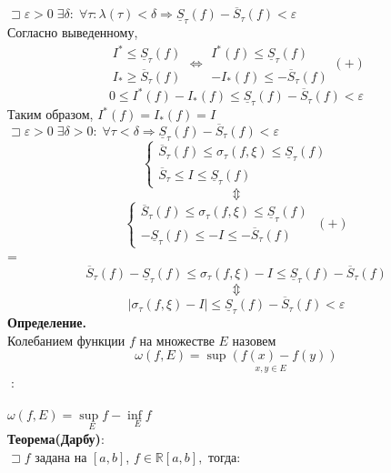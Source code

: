 \documentclass[14pt]{article}
\begin{document}
	$\sqsupset \varepsilon>0\; \exists \delta: \; \forall \tau : \lambda(\tau)<\delta \Rightarrow \underline{S}_{\tau}(f)-\overline{S}_{\tau}(f)<\varepsilon$ \\
	Согласно выведенному,  \\
	$$\boxed{\begin{gathered}
	I^*\leqslant \underline{S}_{\tau}(f) \\
	I_*\geqslant \overline{S}_{\tau}(f)
	\end{gathered} \iff \begin{gathered}
	I^*(f)\leqslant\underline{S}_{\tau}(f)\\
	-I_*(f)\leqslant-\overline{S}_{\tau}(f)
	\end{gathered} (+)}$$ 
	$$\boxed{0 \leqslant I^*(f)-I_*(f) \leqslant \underline{S}_{\tau}(f)-\overline{S}_{\tau}(f)<\varepsilon}$$ 
	Таким образом, $I^*(f)=I_*(f)=I$ \\
	$\sqsupset \varepsilon>0 \; \exists \delta > 0: \; \forall \tau < \delta \Rightarrow \underline{S}_{\tau}(f)-\overline{S}_{\tau}(f)<\varepsilon$ \\
	$$\begin{cases}
	\overline{S}_{\tau}(f)\leqslant\sigma_{\tau}(f,\xi)\leqslant\underline{S}_{\tau}(f) \\
	\overline{S}_{\tau}\leqslant I \leqslant \underline{S}_{\tau}(f)
	\end{cases}$$ 
	$$\Updownarrow$$
	$$
	\begin{cases}
		\overline{S}_{\tau}(f) \leqslant \sigma_{\tau}(f,\xi) \leqslant \underline{S}_{\tau}(f) \\
		-\underline{S}_{\tau}(f) \leqslant -I \leqslant -\overline{S}_{\tau}(f)
	\end{cases}\; (+) 
	$$=
	$$\overline{S}_{\tau}(f)-\underline{S}_{\tau}(f)\leqslant\sigma_{\tau}(f,\xi)-I\leqslant\underline{S}_{\tau}(f)-\overline{S}_{\tau}(f)$$ 
	$$\Updownarrow$$ 
	$$\boxed{|\sigma_{\tau}(f,\xi)-I|\leqslant\underline{S}_{\tau}(f)-\overline{S}_{\tau}(f)<\varepsilon} $$
	\textbf{Определение.} \\
	Колебанием функции $f$ на множестве $E$ назовем \\
	$$\boxed{\omega(f,E)=\underset{x,y \in E}{\sup(f(x)-f(y))}}$$
	 $\;$: \\ \\
	$\omega(f,E)=\underset{E}{\sup f}-\underset{E}{\inf f}$ \\
	\textbf{Теорема(Дарбу)}: \\
	$\sqsupset f$ задана на $[a,b]$, $f \in \mathbb{R}[a,b],$ тогда: \\
\end{document}
